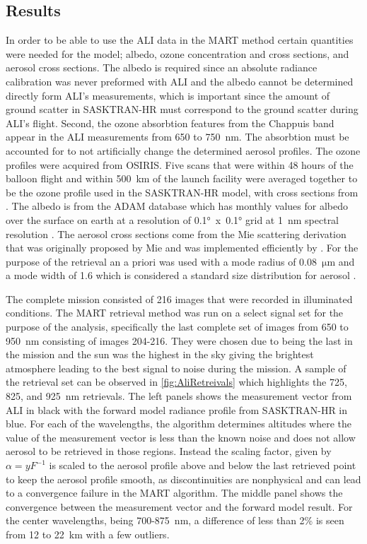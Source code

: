 \documentclass[12pt]{article}
\begin{document}
\subsection{Results}

In order to be able to use the ALI data in the MART method certain quantities were needed for the model; albedo, ozone concentration and cross sections, and aerosol cross sections. The albedo is required since an absolute radiance calibration was never preformed with ALI and the albedo cannot be determined directly form ALI's measurements, which is important since the amount of ground scatter in SASKTRAN-HR must correspond to the ground scatter during ALI's flight. Second, the ozone absorbtion features from the Chappuis band appear in the ALI measurements from 650 to 750~nm. The absorbtion must be accounted for to not artificially change the determined aerosol profiles. The ozone profiles were acquired from OSIRIS. Five scans that were within 48 hours of the balloon flight and  within 500~km of the launch facility were averaged together to be the ozone profile used in the SASKTRAN-HR model, with cross sections from \cite{Burrows1999}. The albedo is from the ADAM database which has monthly values for albedo over the surface on earth at a resolution of 0.1\si{\degree}~x~0.1\si{\degree} grid at 1~nm spectral resolution \citep{Muller2013}. The aerosol cross sections come from the Mie scattering derivation that was originally proposed by Mie and was implemented efficiently by \cite{Wiscombe1980}. For the purpose of the retrieval an a priori was used with a mode radius of 0.08~$\si{\micro\metre}$  and a mode width of 1.6 which is considered a standard size distribution for aerosol \citep{Deshler2003}.

The complete mission consisted of 216 images that were recorded in illuminated conditions. The MART retrieval method was run on a select signal set for the purpose of the analysis, specifically the last complete set of images from 650 to 950~nm consisting of images 204-216. They were chosen due to being the last in the mission and the sun was the highest in the sky giving the brightest atmosphere leading to the best signal to noise during the mission. A sample of the retrieval set can be observed in \autoref{fig:AliRetreivals} which highlights the 725, 825, and 925~nm retrievals. The left panels shows the measurement vector from ALI in black with the forward model radiance profile from SASKTRAN-HR in blue. For each of the wavelengths, the algorithm determines altitudes where the value of the measurement vector is less than the known noise and does not allow aerosol to be retrieved in those regions. Instead the scaling factor, given by $\alpha = yF^{-1}$ is scaled to the aerosol profile above and below the last retrieved point to keep the aerosol profile smooth, as discontinuities are nonphysical and can lead to a convergence failure in the MART algorithm. The middle panel shows the convergence between the measurement vector and the forward model result. For the center wavelengths, being 700-875~nm, a difference of less than 2\% is seen from 12 to 22~km with a few outliers.
\end{document}
